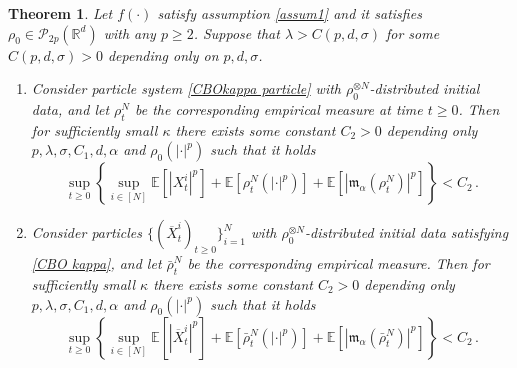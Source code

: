 \documentclass[12pt]{amsart}
\newcommand{\RR}{{\mathbb R}}
\newcommand{\EE}{{\mathbb E}}
\newcommand{\mm}{{\mathfrak{m}}}
\newcommand{\OX}{{\overline{X}}}
\numberwithin{equation}{section}
\newtheorem{theorem}{Theorem}[section]
\begin{document}
\begin{theorem}\label{thm: finite moments}
	Let $f(\cdot)$ satisfy assumption \ref{assum1} and it satisfies $\rho_0\in\mathscr{P}_{2p}(\RR^d)$ with any $p\geq 2$. Suppose that $\lambda> C(p,d,\sigma)$ for some $C(p,d,\sigma)>0$ depending only on $p,d,\sigma$.
	\begin{enumerate}
		\item Consider particle system \eqref{CBOkappa particle} with $\rho_0^{\otimes N}$-distributed initial data, and let $\rho_t^N$ be the corresponding empirical measure at time $t\geq 0$. Then for sufficiently small $\kappa$ there exists some constant $C_2>0$ depending only $p,\lambda,\sigma,C_1,d,\alpha$ and $\rho_0(|\cdot|^p)$ such that it holds
		\begin{equation}\label{eq(1)}
			\sup_{t\geq 0}\left\{\sup_{i\in[N]}\EE[|X_t^i|^p]+\EE[\rho_t^N(|\cdot|^p)]+\EE[|\mm_\alpha(\rho_t^N)|^p]\right\}<C_2\,.
		\end{equation}
		\item Consider particles  $\{(\OX_t^i)_{t\geq 0}\}_{i=1}^N$  with $\rho_0^{\otimes N}$-distributed initial data satisfying \eqref{CBO kappa}, and let $\bar \rho_t^N$ be the corresponding empirical measure. Then  for sufficiently small $\kappa$ there exists some constant $C_2>0$ depending only $p,\lambda,\sigma,C_1,d,\alpha$ and $\rho_0(|\cdot|^p)$  such that it holds 
		\begin{equation}\label{eq(2)}
			\sup_{t\geq 0}\left\{\sup_{i\in[N]}\EE[|\OX_t^i|^p]+\EE[\bar\rho_t^N(|\cdot|^p)]+\EE[|\mm_\alpha(\bar \rho_t^N)|^p]\right\}<C_2\,.
		\end{equation}
	\end{enumerate}
\end{theorem}
\end{document}
